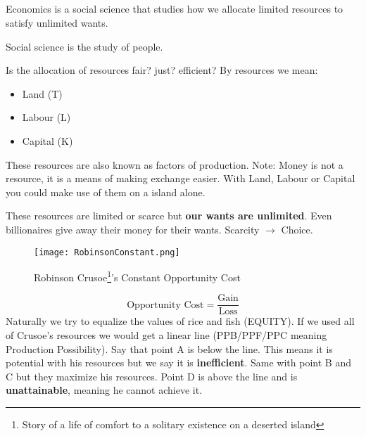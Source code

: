 
\subsection{}
\begin{definition}
    Economics is a social science that studies how we allocate limited resources
    to satisfy unlimited wants.
\end{definition}
\begin{definition}
    Social science is the study of people.
\end{definition}
Is the allocation of resources fair? just? efficient?
By resources we mean:
\begin{itemize}
    \item Land (T)
    \item Labour (L)
    \item Capital (K) 
\end{itemize}
These resources are also known as factors of production.
Note: Money is not a resource, it is a means of making exchange easier.
With Land, Labour or Capital you could make use of them on a island alone.

These resources are limited or scarce but \textbf{our wants are unlimited}. Even billionaires give away their money for their wants.
Scarcity $\rightarrow$ Choice.
\begin{figure}[h!]
    \begin{minipage}{\textwidth}
        \centering
        \texttt{[image: RobinsonConstant.png]}
        \caption[Constant Opportunity Cost]{Robinson Crusoe\footnote[1]{Story of a life of comfort to a solitary existence on a deserted island}'s Constant Opportunity Cost}
    \end{minipage}
\end{figure}
\begin{equation}
    \text{Opportunity Cost} = \frac{\text{Gain}}{\text{Loss}}
\end{equation}
Naturally we try to equalize the values of rice and fish (EQUITY).
If we used all of Crusoe's resources we would get a linear line (PPB/PPF/PPC meaning Production Possibility). Say that point A is below the line. This means it is potential with his resources but we say it is \textbf{inefficient}.
Same with point B and C but they maximize his resources. Point D is above the line and is \textbf{unattainable}, meaning he cannot achieve it.

